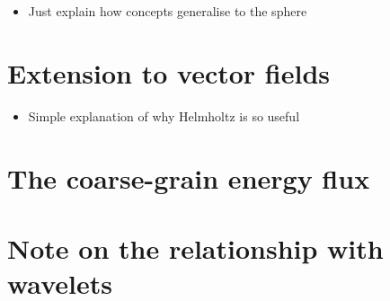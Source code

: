 \begin{itemize}

\item{Just explain how concepts generalise to the sphere}

\end{itemize}

\section{Extension to vector fields}

\begin{itemize}

\item{Simple explanation of why Helmholtz is so useful}

\end{itemize}

\section{The coarse-grain energy flux}

\section{Note on the relationship with wavelets}


